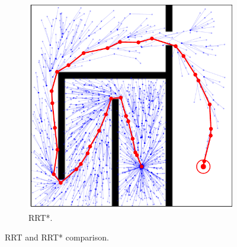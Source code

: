 \documentclass{beamer}
\begin{document}
\begin{frame}
\begin{figure}[!ht]
\begin{subfigure}[b]{0.45\textwidth}
			\includegraphics[width=\textwidth]{figChap3/RRTstar_maze_7060i_35w.pdf}
			\caption{RRT*.} 
		\end{subfigure}   
		\caption{RRT and RRT* comparison.} 
	  \end{figure}
\end{frame}	
\end{document}
